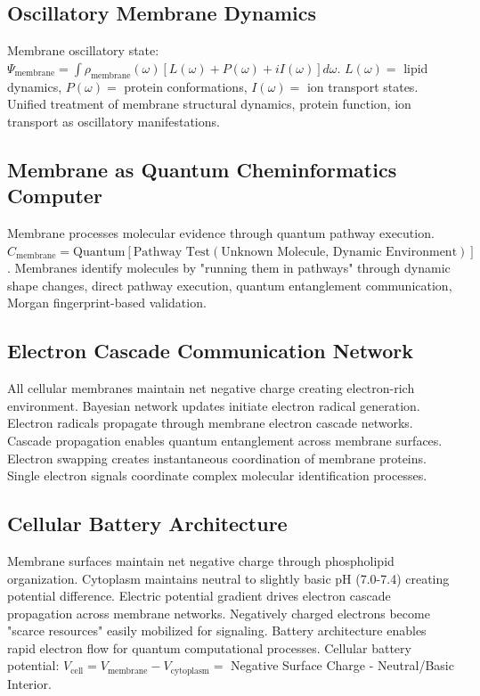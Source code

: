 \documentclass[12pt,a4paper]{article}
\begin{document}
\subsection{Oscillatory Membrane Dynamics}

Membrane oscillatory state: $\Psi_{\text{membrane}} = \int \rho_{\text{membrane}}(\omega) [L(\omega) + P(\omega) + iI(\omega)] d\omega$. $L(\omega) =$ lipid dynamics, $P(\omega) =$ protein conformations, $I(\omega) =$ ion transport states. Unified treatment of membrane structural dynamics, protein function, ion transport as oscillatory manifestations.

\subsection{Membrane as Quantum Cheminformatics Computer}

Membrane processes molecular evidence through quantum pathway execution. $C_{\text{membrane}} = \text{Quantum}[\text{Pathway Test}(\text{Unknown Molecule, Dynamic Environment})]$. Membranes identify molecules by "running them in pathways" through dynamic shape changes, direct pathway execution, quantum entanglement communication, Morgan fingerprint-based validation.

\subsection{Electron Cascade Communication Network}

All cellular membranes maintain net negative charge creating electron-rich environment. Bayesian network updates initiate electron radical generation. Electron radicals propagate through membrane electron cascade networks. Cascade propagation enables quantum entanglement across membrane surfaces. Electron swapping creates instantaneous coordination of membrane proteins. Single electron signals coordinate complex molecular identification processes.

\subsection{Cellular Battery Architecture}

Membrane surfaces maintain net negative charge through phospholipid organization. Cytoplasm maintains neutral to slightly basic pH (7.0-7.4) creating potential difference. Electric potential gradient drives electron cascade propagation across membrane networks. Negatively charged electrons become "scarce resources" easily mobilized for signaling. Battery architecture enables rapid electron flow for quantum computational processes. Cellular battery potential: $V_{\text{cell}} = V_{\text{membrane}} - V_{\text{cytoplasm}} =$ Negative Surface Charge - Neutral/Basic Interior.
\end{document}

